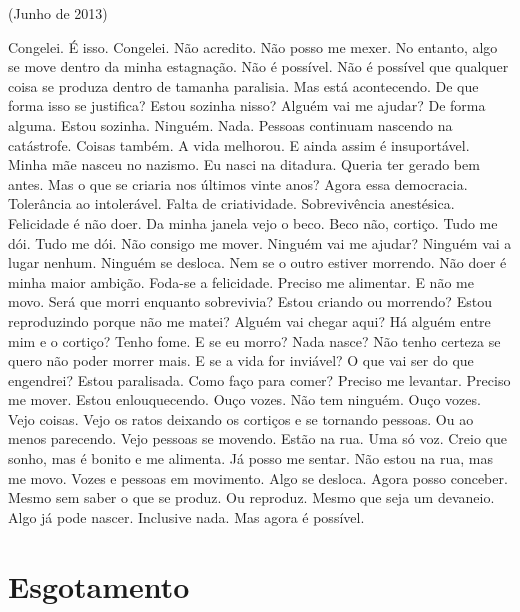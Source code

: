 \hfill(Junho de 2013)\medskip

\noindent{}Congelei. É isso. Congelei. Não acredito. Não posso me mexer. No
entanto, algo se move dentro da minha estagnação. Não é possível. Não é
possível que qualquer coisa se produza dentro de tamanha paralisia. Mas
está acontecendo. De que forma isso se justifica? Estou sozinha nisso?
Alguém vai me ajudar? De forma alguma. Estou sozinha. Ninguém. Nada.
Pessoas continuam nascendo na catástrofe. Coisas também. A vida
melhorou. E ainda assim é insuportável. Minha mãe nasceu no nazismo. Eu
nasci na ditadura. Queria ter gerado bem antes. Mas o que se criaria nos
últimos vinte anos? Agora essa democracia. Tolerância ao intolerável.
Falta de criatividade. Sobrevivência anestésica. Felicidade é não doer.
Da minha janela vejo o beco. Beco não, cortiço. Tudo me dói. Tudo me
dói. Não consigo me mover. Ninguém vai me ajudar? Ninguém vai a lugar
nenhum. Ninguém se desloca. Nem se o outro estiver morrendo. Não doer é
minha maior ambição. Foda-se a felicidade. Preciso me alimentar. E não
me movo. Será que morri enquanto sobrevivia? Estou criando ou morrendo?
Estou reproduzindo porque não me matei? Alguém vai chegar aqui? Há
alguém entre mim e o cortiço? Tenho fome. E se eu morro? Nada nasce? Não
tenho certeza se quero não poder morrer mais. E se a vida for inviável?
O que vai ser do que engendrei? Estou paralisada. Como faço para comer?
Preciso me levantar. Preciso me mover. Estou enlouquecendo. Ouço vozes.
Não tem ninguém. Ouço vozes. Vejo coisas. Vejo os ratos deixando os
cortiços e se tornando pessoas. Ou ao menos parecendo. Vejo pessoas se
movendo. Estão na rua. Uma só voz. Creio que sonho, mas é bonito e me
alimenta. Já posso me sentar. Não estou na rua, mas me movo. Vozes e
pessoas em movimento. Algo se desloca. Agora posso conceber. Mesmo sem
saber o que se produz. Ou reproduz. Mesmo que seja um devaneio. Algo já
pode nascer. Inclusive nada. Mas agora é possível.


\chapter{Esgotamento}

